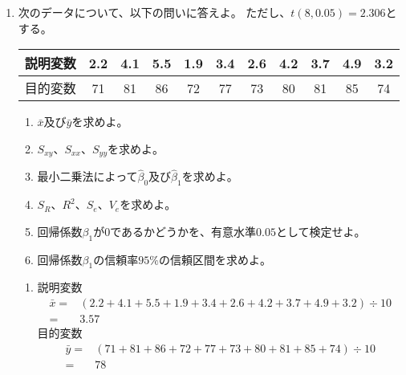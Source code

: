 \documentclass[12pt,b5paper]{ltjsarticle}
\begin{document}
\begin{enumerate}
      \hrulefill

 \item
      次のデータについて、以下の問いに答えよ。
      ただし、$t(8,0.05)=2.306$とする。
      \begin{center}
       \begin{tabular}{|c|c|c|c|c|c|c|c|c|c|c|}
        \hline
        説明変数 & 2.2 & 4.1 & 5.5 & 1.9 & 3.4 & 2.6 & 4.2 & 3.7 & 4.9 & 3.2 \\
        \hline \hline
        目的変数 & 71 & 81 & 86 & 72 & 77 & 73 & 80 & 81 & 85 & 74 \\
        \hline
       \end{tabular}
      \end{center}
      \begin{enumerate}
       \item $\bar{x}$及び$\bar{y}$を求めよ。
       \item $S_{xy}$、$S_{xx}$、$S_{yy}$を求めよ。
       \item 最小二乗法によって$\hat{\beta}_0$及び$\hat{\beta}_1$を求めよ。
       \item $S_R$、$R^2$、$S_e$、$V_e$を求めよ。
       \item 回帰係数$\beta_1$が$0$であるかどうかを、有意水準$0.05$として検定せよ。
       \item 回帰係数$\beta_1$の信頼率$95\%$の信頼区間を求めよ。
      \end{enumerate}

      \dotfill

%
%
%
%
%
%
%
%
%
%
%
%
%
%
%
%
%
%
%

      \begin{enumerate}
       \item
            説明変数
            \begin{align}
             \bar{x} =& (2.2 + 4.1 + 5.5 + 1.9 + 3.4 + 2.6 + 4.2 + 3.7 + 4.9 + 3.2) \div 10\\
             =& 3.57 %
            \end{align}
            目的変数
            \begin{align}
             \bar{y} =& (71 + 81 + 86 + 72 + 77 + 73 + 80 + 81 + 85 + 74)\div 10\\
             =& 78 %
            \end{align}


\end{enumerate}
\end{enumerate}
\end{document}
